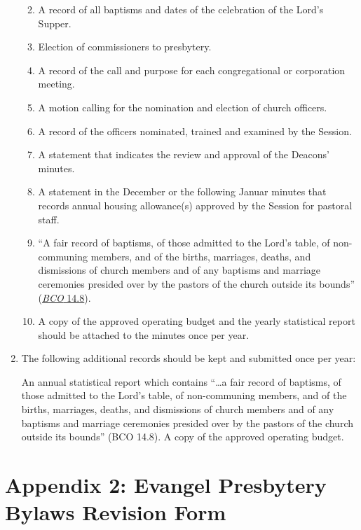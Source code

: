 \documentclass[
]{book}
\providecommand{\tightlist}{%
  \setlength{\itemsep}{0pt}\setlength{\parskip}{0pt}}
\begin{document}
\begin{enumerate}
  \begin{enumerate}
  \def\labelenumii{\arabic{enumii}.}
  \tightlist
  \item
    A record of all baptisms and dates of the celebration of the Lord's Supper.
  \item
    Election of commissioners to presbytery.
  \item
    A record of the call and purpose for each congregational or corporation meeting.
  \item
    A motion calling for the nomination and election of church officers.
  \item
    A record of the officers nominated, trained and examined by the Session.
  \item
    A statement that indicates the review and approval of the Deacons' minutes.
  \item
    A statement in the December or the following Januar minutes that records annual housing allowance(s) approved by the Session for pastoral staff.
  \item
    ``A fair record of baptisms, of those admitted to the Lord's table, of non-communing members, and of the births, marriages, deaths, and dismissions of church members and of any baptisms and marriage ceremonies presided over by the pastors of the church outside its bounds'' (\href{https://bco.evangelpresbytery.com/form-of-government.html\#the-church-session}{\emph{BCO} 14.8}).
  \item
    A copy of the approved operating budget and the yearly statistical report should be attached to the minutes once per year.
  \end{enumerate}
\item
  The following additional records should be kept and submitted once per year:

  An annual statistical report which contains ``\ldots a fair record of baptisms, of those admitted to the Lord's table, of non-communing members, and of the births, marriages, deaths, and dismissions of church members and of any baptisms and marriage ceremonies presided over by the pastors of the church outside its bounds'' (BCO 14.8).
  A copy of the approved operating budget.
\end{enumerate}

\hypertarget{appendix-2-evangel-presbytery-bylaws-revision-form}{%
\section*{Appendix 2: Evangel Presbytery Bylaws Revision Form}\label{appendix-2-evangel-presbytery-bylaws-revision-form}}
\end{document}
